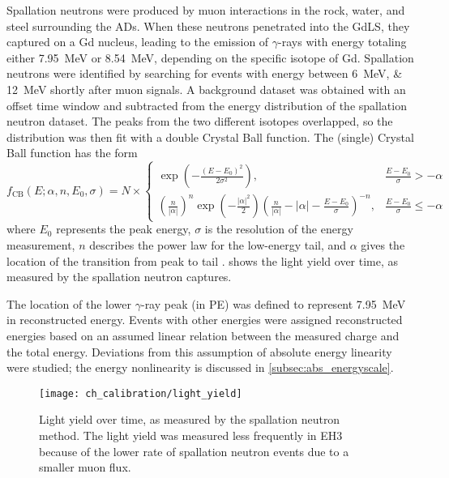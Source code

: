 Spallation neutrons were produced by muon interactions in the rock,
water, and steel surrounding the ADs.
When these neutrons penetrated into the GdLS,
they captured on a Gd nucleus, leading to the emission of $\gamma$-rays
with energy totaling either \SI{7.95}{\MeV} or \SI{8.54}{\MeV},
depending on the specific isotope of Gd.
Spallation neutrons were identified by searching for events
with energy between \SIlist{6;12}{\MeV} shortly after muon signals.
A background dataset was obtained with an offset time window
and subtracted from the energy distribution of the spallation neutron dataset.
The peaks from the two different isotopes overlapped,
so the distribution was then fit with a double Crystal Ball function.
The (single) Crystal Ball function has the form
\begin{equation}\label{eq:crystal_ball}
    f_\text{CB}(E;\alpha, n, E_0, \sigma) = N \times \begin{cases}
        \exp\left(-\frac{(E-E_0)^2}{2\sigma^2}\right),
            & \frac{E-E_0}{\sigma} > -\alpha \\
        \left(\frac{n}{|\alpha|}\right)^n \exp\left(-\frac{|\alpha|^2}{2}\right)
        \left(\frac{n}{|\alpha|} - |\alpha| - \frac{E-E_0}{\sigma}\right)^{-n},
            & \frac{E-E_0}{\sigma} \leq -\alpha
    \end{cases}
\end{equation}
where $E_0$ represents the peak energy,
$\sigma$ is the resolution of the energy measurement,
$n$ describes the power law for the low-energy tail,
and $\alpha$ gives the location of the transition from peak to tail \cite{cbfunction}.
 shows the light yield over time,
as measured by the spallation neutron captures.

The location of the lower $\gamma$-ray peak (in PE)
was defined to represent \SI{7.95}{\MeV} in reconstructed energy.
Events with other energies were assigned reconstructed energies
based on an assumed linear relation between the measured charge
and the total energy.
Deviations from this assumption of absolute energy linearity were studied;
the energy nonlinearity is discussed in \cref{subsec:abs_energyscale}.

\begin{figure}
    \centering
    \texttt{[image: ch\_calibration/light\_yield]}
    \caption[Light yield over time]{
        Light yield over time, as measured by the spallation neutron method.
        The light yield was measured less frequently in EH3
        because of the lower rate of spallation neutron events
        due to a smaller muon flux.
    }
    \label{fig:lightyield}
\end{figure}

